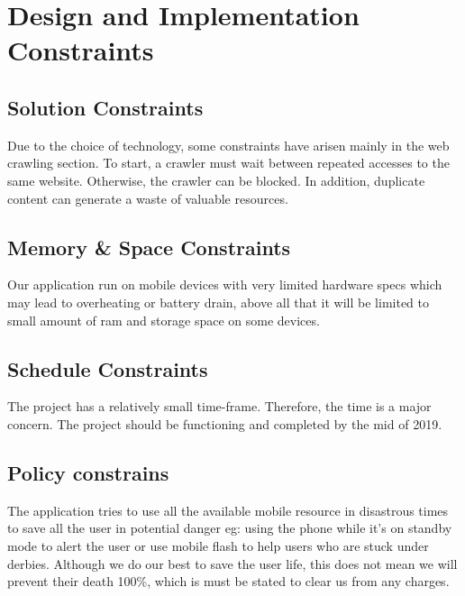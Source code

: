 \documentclass[10pt,a4paper]{article}
\begin{document}
\section{Design and Implementation Constraints}

\subsection{Solution Constraints}
Due to the choice of technology, some constraints have arisen mainly in the web crawling section. To start, a crawler must wait between repeated accesses to the same website. Otherwise, the crawler can be blocked. In addition, duplicate content can generate a waste of valuable resources.

\subsection{Memory \& Space Constraints}
Our application run on mobile devices with very limited hardware specs which may lead to overheating or battery drain, above all that it will be limited to small amount of ram and storage space on some devices. 

\subsection{Schedule Constraints}
The project has a relatively small time-frame. Therefore, the time is a major concern. The project should be functioning and completed by the mid of 2019.

\subsection{Policy constrains}
The application tries to use all the available mobile resource in disastrous times to save all the user in potential danger eg: using the phone while it's on standby mode to alert the user or use mobile flash to help users who are stuck under derbies. Although we do our best to save the user life, this does not mean we will prevent their death 100\%, which is must be stated to clear us from any charges.
\end{document}
